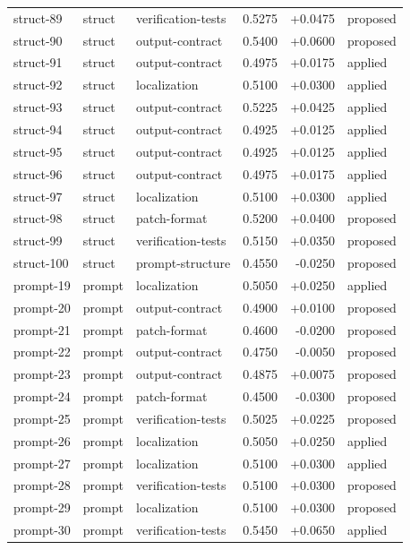 \begin{center}
\begin{longtable}{llp{5.2cm}rrl}
struct-89 & struct & verification-tests & 0.5275 & +0.0475 & proposed \\
struct-90 & struct & output-contract & 0.5400 & +0.0600 & proposed \\
struct-91 & struct & output-contract & 0.4975 & +0.0175 & applied \\
struct-92 & struct & localization & 0.5100 & +0.0300 & applied \\
struct-93 & struct & output-contract & 0.5225 & +0.0425 & applied \\
struct-94 & struct & output-contract & 0.4925 & +0.0125 & applied \\
struct-95 & struct & output-contract & 0.4925 & +0.0125 & applied \\
struct-96 & struct & output-contract & 0.4975 & +0.0175 & applied \\
struct-97 & struct & localization & 0.5100 & +0.0300 & applied \\
struct-98 & struct & patch-format & 0.5200 & +0.0400 & proposed \\
struct-99 & struct & verification-tests & 0.5150 & +0.0350 & proposed \\
struct-100 & struct & prompt-structure & 0.4550 & -0.0250 & proposed \\
prompt-19 & prompt & localization & 0.5050 & +0.0250 & applied \\
prompt-20 & prompt & output-contract & 0.4900 & +0.0100 & proposed \\
prompt-21 & prompt & patch-format & 0.4600 & -0.0200 & proposed \\
prompt-22 & prompt & output-contract & 0.4750 & -0.0050 & proposed \\
prompt-23 & prompt & output-contract & 0.4875 & +0.0075 & proposed \\
prompt-24 & prompt & patch-format & 0.4500 & -0.0300 & proposed \\
prompt-25 & prompt & verification-tests & 0.5025 & +0.0225 & proposed \\
prompt-26 & prompt & localization & 0.5050 & +0.0250 & applied \\
prompt-27 & prompt & localization & 0.5100 & +0.0300 & applied \\
prompt-28 & prompt & verification-tests & 0.5100 & +0.0300 & proposed \\
prompt-29 & prompt & localization & 0.5100 & +0.0300 & proposed \\
prompt-30 & prompt & verification-tests & 0.5450 & +0.0650 & applied \\

\end{longtable}
\end{center}
